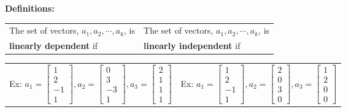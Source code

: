 \documentclass[11pt,fleqn]{article}
\begin{document}
\renewcommand{\headrulewidth}{0pt}
\newcommand{\blank}[1]{\rule{#1}{0.75pt}}
\renewcommand{\d}{\displaystyle}
\vspace*{-0.7in}
\begin{center}
  \large {}
\end{center}
\noindent\textbf{Definitions:}\\

\noindent\begin{tabularx}{\textwidth}{XX}
The set of vectors, $a_1,a_2, \cdots, a_k$, is 
& 
The set of vectors, $a_1,a_2, \cdots, a_k$, is \\
 \textbf{linearly dependent} if
 &
 \textbf{linearly independent} if\\
\end{tabularx}
\vfill

\noindent\begin{tabularx}{\textwidth}{XX}
Ex: $a_1=\begin{bmatrix} 1\\2\\-1\\1 \end{bmatrix},a_2=\begin{bmatrix} 0\\3\\-3\\1 \end{bmatrix},a_3=\begin{bmatrix} 2\\1\\1\\1 \end{bmatrix}$ 
& 
Ex: $a_1=\begin{bmatrix} 1\\2\\-1\\1 \end{bmatrix},a_2=\begin{bmatrix} 2\\0\\3\\0 \end{bmatrix},a_3=\begin{bmatrix} 1\\2\\0\\0 \end{bmatrix}$ \\
 
\end{tabularx}
\end{document}
